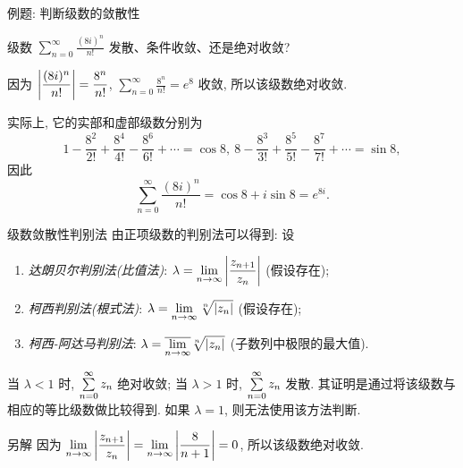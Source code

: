 

\begin{frame}{例题: 判断级数的敛散性}
\onslide<+->
\begin{example}
级数 $\displaystyle\sum_{n=0}^\infty\frac{(8i)^n}{n!}$ 发散、条件收敛、还是绝对收敛?
\end{example}
\onslide<+->
\begin{solution}
因为 $\left|\dfrac{(8i)^n}{n!}\right|=\dfrac{8^n}{n!}$, $\displaystyle\sum_{n=0}^\infty\frac{8^n}{n!}=e^8$ 收敛, 所以该级数绝对收敛.
\end{solution}
\onslide<+->
实际上, 它的实部和虚部级数分别为
\[1-\frac{8^2}{2!}+\frac{8^4}{4!}-\frac{8^6}{6!}+\cdots=\cos 8,\ 
8-\frac{8^3}{3!}+\frac{8^5}{5!}-\frac{8^7}{7!}+\cdots=\sin 8,\]
\onslide<+->
因此
\[\sum_{n=0}^\infty\frac{(8i)^n}{n!}=\cos 8+i\sin 8=e^{8i}.\]
\end{frame}


\begin{frame}{级数敛散性判别法}
由正项级数的判别法可以得到:
\onslide<+->
设
\begin{enumerate}
\item \emph{达朗贝尔判别法(比值法)}: $\lambda=\displaystyle\lim_{n\to\infty}\left|\frac{z_{n+1}}{z_n}\right|$ (假设存在);
\item \emph{柯西判别法(根式法)}: $\lambda=\displaystyle\lim_{n\to\infty}\sqrt[n]{\left|z_n\right|}$ (假设存在);
\item \emph{柯西-阿达马判别法}: $\lambda=\displaystyle\overline{\lim_{n\to\infty}}\sqrt[n]{\left|z_n\right|}$ (子数列中极限的最大值).
\end{enumerate}
\onslide<+->
当 $\lambda<1$ 时, $\sum\limits_{n=0}^\infty z_n$ 绝对收敛;
\onslide<+->
当 $\lambda>1$ 时, $\sum\limits_{n=0}^\infty z_n$ 发散.
\onslide<+->
其证明是通过将该级数与相应的等比级数做比较得到.
\onslide<+->
如果 $\lambda=1$, 则无法使用该方法判断.
\onslide<+->
\begin{block}{另解}
因为 $\displaystyle\lim_{n\to\infty}\left|\frac{z_{n+1}}{z_n}\right|=\lim_{n\to\infty}\left|\dfrac{8}{n+1}\right|=0$, 所以该级数绝对收敛.
\end{block}
\end{frame}

